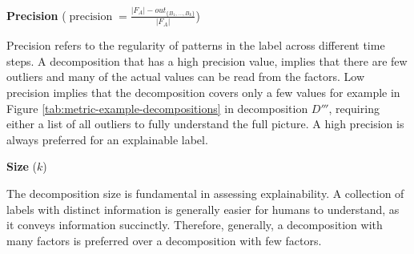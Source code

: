 \textbf{Precision} ($\operatorname{precision} = \frac{|F_A| - out_{\{B_1,\dots,B_k\}}}{|F_A|}$)

Precision refers to the regularity of patterns in the label across different time steps.
A decomposition that has a high precision value, implies that there are few outliers and many of the actual values can be read from the factors.
Low precision implies that the decomposition covers only a few values for example in Figure \ref{tab:metric-example-decompositions} in decomposition $D'''$, requiring either a list of all outliers to fully understand the full picture.
A high precision is always preferred for an explainable label. 

\textbf{Size} ($k$)

The decomposition size is fundamental in assessing explainability.
A collection of labels with distinct information is generally easier for humans to understand, as it conveys information succinctly.
Therefore, generally, a decomposition with many factors is preferred over a decomposition with few factors.

